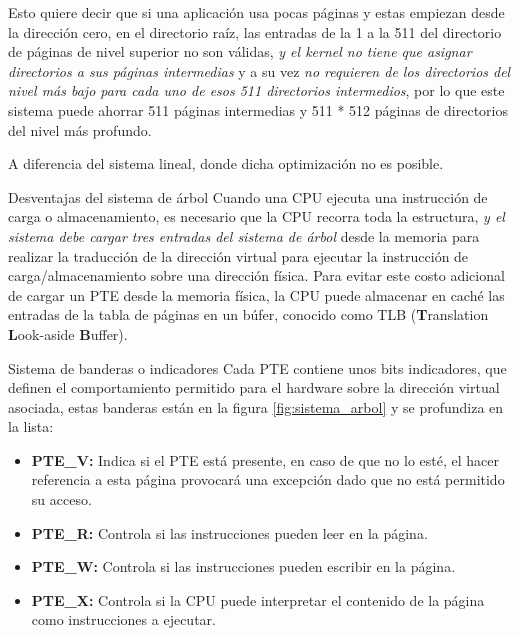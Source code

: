 \documentclass{libs/ufc_format}
\begin{document}
\begin{frame}{}
    Esto quiere decir que si una aplicación usa pocas páginas y estas empiezan desde la dirección cero, en el directorio raíz, las entradas de la 1 a la 511 del directorio de páginas de nivel superior no son válidas, \emph{y el kernel no tiene que asignar directorios a sus páginas intermedias} y a su vez \emph{no requieren de los directorios del nivel más bajo para cada uno de esos 511 directorios intermedios}, por lo que este sistema puede ahorrar 511 páginas intermedias y 511 * 512 páginas de directorios del nivel más profundo.\newline

    \vspace{0.2cm}
    
    A diferencia del sistema lineal, donde dicha optimización no es posible. \cite{xv6_book}
\end{frame}
\begin{frame}{Desventajas del sistema de árbol}
    Cuando una CPU ejecuta una instrucción de carga o almacenamiento, es necesario que la CPU recorra toda la estructura, \emph{y el sistema debe cargar tres entradas del sistema de árbol} desde la memoria para realizar la traducción de la dirección virtual para ejecutar la instrucción de carga/almacenamiento sobre una dirección física. Para evitar este costo adicional de cargar un PTE desde la memoria física, la CPU puede almacenar en caché las entradas de la tabla de páginas en un búfer, conocido como TLB (\textbf{T}ranslation \textbf{L}ook-aside \textbf{B}uffer). \cite{xv6_book}
\end{frame}
\begin{frame}{Sistema de banderas o indicadores}
    Cada PTE contiene unos bits indicadores, que definen el comportamiento permitido para el hardware sobre la dirección virtual asociada, estas banderas están en la figura \ref{fig:sistema_arbol} y se profundiza en la lista:

    \vspace{0.2cm}
    
    \begin{itemize}
        \item \textbf{PTE\_V:} Indica si el PTE está presente, en caso de que no lo esté, el hacer referencia a esta página provocará una excepción dado que no está permitido su acceso.
        \item \textbf{PTE\_R:} Controla si las instrucciones pueden leer en la página.
        \item \textbf{PTE\_W:} Controla si las instrucciones pueden escribir en la página.
        \item \textbf{PTE\_X:} Controla si la CPU puede interpretar el contenido de la página como instrucciones a ejecutar.
    \end{itemize}
\end{frame}
\end{document}
